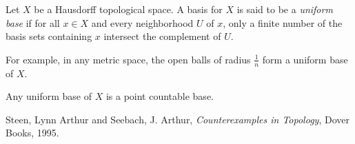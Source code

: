 \documentclass[12pt]{article}
\newcommand{\<}{\langle}
\renewcommand{\>}{\rangle}
\begin{document}
Let $X$ be a Hausdorff topological space.  A basis for $X$ is said to be a \emph{uniform base} if for all $x\in X$ and every neighborhood $U$ of $x$, only a finite number of the basis sets containing $x$ intersect the complement of $U$.

For example, in any metric space, the open balls of radius $\frac{1}{n}$ form a uniform base of $X$.

Any uniform base of $X$ is a point countable base.

\begin{thebibliography}{9}
Steen, Lynn Arthur and Seebach, J. Arthur, \emph{Counterexamples in Topology}, Dover Books, 1995.
\end{thebibliography}
\end{document}

